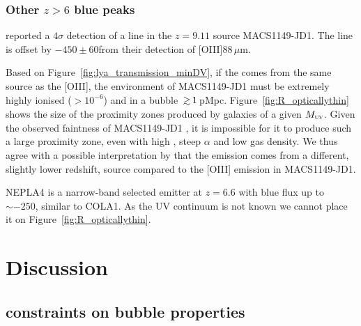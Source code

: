 \documentclass[fleqn,usenatbib]{mnras}
\begin{document}
\subsubsection{Other $z>6$ blue peaks}
\label{sec:results_obs_other}

\citet{Hashimoto2018a} reported a $4\sigma$ detection of a \lya line in the $z=9.11$ source MACS1149-JD1. The \lya line is offset by $-450\pm60$\kms from their detection of [OIII]88\,$\mu$m. 

Based on Figure~\ref{fig:lya_transmission_minDV}, if the \lya comes from the same source as the [OIII], the environment of MACS1149-JD1 must be extremely highly ionised ($>10^{-6}$) and in a bubble $\simgt1$\,pMpc. Figure~\ref{fig:R_opticallythin} shows the size of the proximity zones produced by galaxies of a given $\MUV$. Given the observed faintness of MACS1149-JD1 \citep[$\MUV = 18.5\pm0.1$ based on lens modelling and fits to photometry and grism spectroscopy,][]{Hoag2018a}, it is impossible for it to produce such a large proximity zone, even with high \fesc, steep $\alpha$ and low gas density. We thus agree with a possible interpretation by \citet{Hashimoto2018a} that the \lya emission comes from a different, slightly lower redshift, source compared to the [OIII] emission in MACS1149-JD1.

NEPLA4 \citep{Songaila2018} is a narrow-band selected \lya emitter at $z=6.6$ with blue flux up to $\sim-250$\kms, similar to COLA1. As the UV continuum is not known we cannot place it on Figure~\ref{fig:R_opticallythin}.

\section{Discussion}
\label{sec:disc}

\subsection{\lya constraints on bubble properties}
\label{sec:disc_redpeaks}
\end{document}
